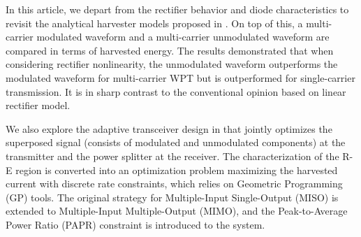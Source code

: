 In this article, we depart from the rectifier behavior and diode characteristics to revisit the analytical harvester models proposed in \cite{Clerckx2016}. On top of this, a multi-carrier modulated waveform and a multi-carrier unmodulated waveform are compared in terms of harvested energy. The results demonstrated that when considering rectifier nonlinearity, the unmodulated waveform outperforms the modulated waveform for multi-carrier WPT but is outperformed for single-carrier transmission. It is in sharp contrast to the conventional opinion based on linear rectifier model.

We also explore the adaptive transceiver design in \cite{Clerckx2018} that jointly optimizes the superposed signal (consists of modulated and unmodulated components) at the transmitter and the power splitter at the receiver. The characterization of the R-E region is converted into an optimization problem maximizing the harvested current with discrete rate constraints, which relies on Geometric Programming (GP) tools. The original strategy for Multiple-Input Single-Output (MISO) is extended to Multiple-Input Multiple-Output (MIMO), and the Peak-to-Average Power Ratio (PAPR) constraint is introduced to the system. 